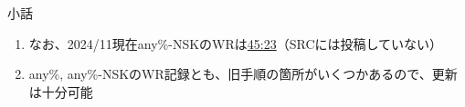 \begin{\Columnname}{小話}
\begin{enumerate}[label={\sarrow}]
\tcbline*
\item なお、2024/11現在any\%-NSKのWRは\href{https://www.twitch.tv/videos/1689044910}{45:23}（SRCには投稿していない）
\item any\%, any\%-NSKのWR記録とも、旧手順の箇所がいくつかあるので、更新は十分可能
\end{enumerate}
\end{\Columnname}


\begin{appendices}
\end{appendices}

